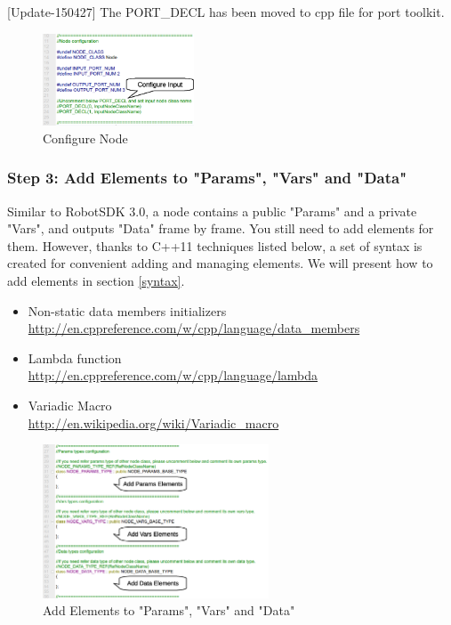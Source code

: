 \documentclass[a4paper,10pt]{book}
\begin{document}
[Update-150427] The PORT\_DECL has been moved to cpp file for port toolkit.

\begin{figure}
 \centering
 \includegraphics[width=0.4\textwidth]{img/header2.eps}
 \caption{Configure Node}
 \label{fig:header2}
\end{figure}

\subsubsection{Step 3: Add Elements to "Params", "Vars" and "Data"}

Similar to RobotSDK 3.0, a node contains a public "Params" and a private "Vars", and outputs "Data" frame by frame. You still need to add elements for them. However, thanks to C++11 techniques listed below, a set of syntax is created for convenient adding and managing elements. We will present how to add elements in section \ref{syntax}.

\begin{itemize}
 \item Non-static data members initializers \\
 \url{http://en.cppreference.com/w/cpp/language/data_members}
 \item Lambda function \\
 \url{http://en.cppreference.com/w/cpp/language/lambda}
 \item Variadic Macro \\
 \url{http://en.wikipedia.org/wiki/Variadic_macro}
\end{itemize}

\begin{figure}
 \centering
 \includegraphics[width=0.6\textwidth]{img/header3.eps}
 \caption{Add Elements to "Params", "Vars" and "Data"}
 \label{fig:header3}
\end{figure}
\end{document}
